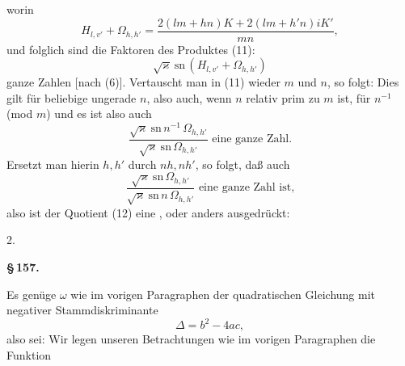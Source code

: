 
worin
\[
H_{l,v'} + \Omega_{h,h'} = \dfrac{2(lm+hn)K + 2(lm+h'n)iK'}{mn}, %
\]
und folglich sind die Faktoren des Produktes (11):
\[
\sqrt{\varkappa}\ \mathrm{sn}\,(H_{l,v'} + \Omega_{h,h'})
\]
ganze Zahlen [nach (6)]. Vertauscht man in (11) wieder $m$ und $n$, so folgt:
Dies gilt für beliebige ungerade $n$, also auch, wenn $n$ relativ prim zu $m$ ist, für $n^{-1}$ (mod $m$) und es ist also auch
\[
\dfrac{\sqrt{\varkappa}\ \mathrm{sn}\,n^{-1}\,\Omega_{h,h'}}{\sqrt{\varkappa}\ \mathrm{sn}\,\Omega_{h,h'}} \text{ eine ganze Zahl.}
\]
Ersetzt man hierin $h,h'$ durch $nh, nh'$, so folgt, da\ss{} auch
\[
\dfrac{\sqrt{\varkappa}\ \mathrm{sn}\,\Omega_{h,h'}}{\sqrt{\varkappa}\ \mathrm{sn}\,n\,\Omega_{h,h'}} \text{ eine ganze Zahl ist,}
\]
also ist der Quotient (12) eine , oder anders ausgedrückt:

2. 

\begin{center}
\textbf{\S\,157.\qquad {}}
\end{center}

Es genüge $\omega$ wie im vorigen Paragraphen der quadratischen Gleichung
mit negativer Stammdiskriminante
\[
\varDelta = b^2 - 4ac,
\]
also sei:
Wir legen unseren Betrachtungen wie im vorigen Paragraphen die Funktion
